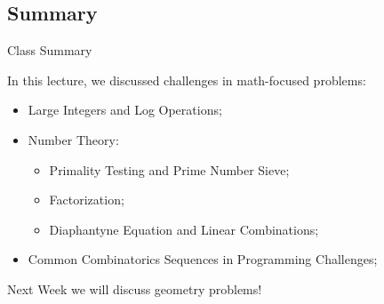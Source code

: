\subsection{Summary}
\begin{frame}{Class Summary}

In this lecture, we discussed challenges in math-focused problems:

\begin{itemize}
  \item Large Integers and Log Operations;
  \item Number Theory:
  \begin{itemize}
    \item Primality Testing and Prime Number Sieve;
    \item Factorization;
    \item Diaphantyne Equation and Linear Combinations;
  \end{itemize}
  \item Common Combinatorics Sequences in Programming Challenges;
\end{itemize}
\bigskip

Next Week we will discuss geometry problems!
\end{frame}


%
%




